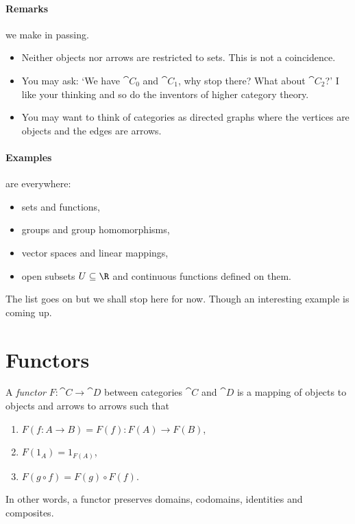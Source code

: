 \documentclass{article}
\begin{document}
\paragraph{Remarks} we make in passing.
\begin{itemize}
    \item Neither objects nor arrows are restricted to sets. This is not a coincidence.
    \item You may ask: `We have $\cat C_0$ and $\cat C_1$, why stop there? What about $\cat C_2$?' I like 
        your thinking and so do the inventors of higher category theory.
    \item You may want to think of categories as directed graphs where the vertices are objects and 
        the edges are arrows.
\end{itemize}

\paragraph{Examples} are everywhere:
\begin{itemize}
    \item sets and functions,
    \item groups and group homomorphisms,
    \item vector spaces and linear mappings,
    \item open subsets $U\subseteq\R$ and continuous functions defined on them.
\end{itemize}
The list goes on but we shall stop here for now. Though an interesting example is coming up.

\section{Functors}

\begin{definition}[Functor]
    A \emph{functor} $F:\cat C\to\cat D$ between categories $\cat C$ and $\cat D$ is a mapping of 
    objects to objects and arrows to arrows such that 
    \begin{enumerate}
        \item $F(f:A\to B)=F(f):F(A)\to F(B)$, 
        \item $F(1_A)=1_{F(A)}$,
        \item $F(g\circ f)=F(g)\circ F(f)$.
    \end{enumerate}
    In other words, a functor preserves domains, codomains, identities and composites.
\end{definition}
\end{document}
